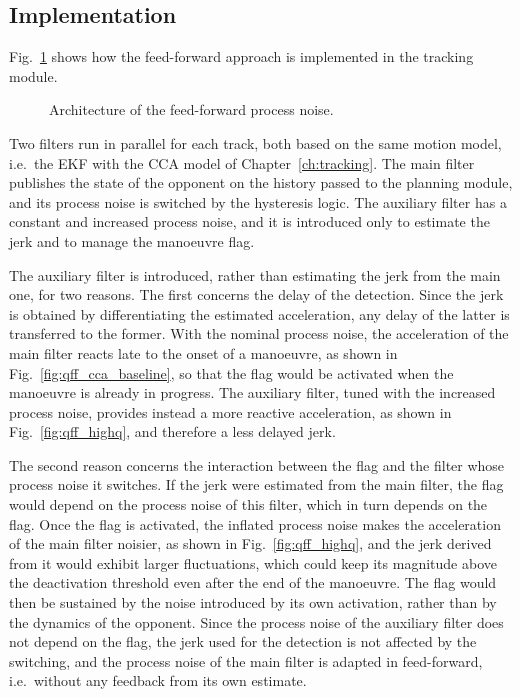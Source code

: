 \subsection{Implementation}
\label{subsec:qff_implementation}
\label{sec:qff_implementation}

Fig.~\ref{fig:qff_scheme} shows how the feed-forward approach is implemented in the tracking
module.

\begin{figure}[H]
    \centering
    
    \caption{Architecture of the feed-forward process noise.}
    \label{fig:qff_scheme}
\end{figure}

Two filters run in parallel for each track, both based on the same motion model, i.e.\ the EKF
with the CCA model of Chapter~\ref{ch:tracking}. The main filter publishes the state of
the opponent on the history passed to the planning module, and its process noise is switched
by the hysteresis logic. The auxiliary filter has a constant and increased process noise, and it is
introduced only to estimate the jerk and to manage the manoeuvre flag.

The auxiliary filter is introduced, rather than estimating the jerk from the main one, for two
reasons. The first concerns the delay of the detection. Since the jerk is obtained by
differentiating the estimated acceleration, any delay of the latter is transferred to the former.
With the nominal process noise, the acceleration of the main filter reacts late to the onset of a
manoeuvre, as shown in Fig.~\ref{fig:qff_cca_baseline}, so that the flag would be activated when
the manoeuvre is already in progress. The auxiliary filter, tuned with the increased process
noise, provides instead a more reactive acceleration, as shown in Fig.~\ref{fig:qff_highq}, and
therefore a less delayed jerk.

The second reason concerns the interaction between the flag and the filter whose process noise
it switches. If the jerk were estimated from the main filter, the flag would depend on the
process noise of this filter, which in turn depends on the flag. Once the flag is activated, the
inflated process noise makes the acceleration of the main filter noisier, as shown in
Fig.~\ref{fig:qff_highq}, and the jerk derived from it would exhibit larger fluctuations, which
could keep its magnitude above the deactivation threshold even after the end of the manoeuvre.
The flag would then be sustained by the noise introduced by its own activation, rather than by
the dynamics of the opponent. Since the process noise of the auxiliary filter does not depend on
the flag, the jerk used for the detection is not affected by the switching, and the process
noise of the main filter is adapted in feed-forward, i.e.\ without any feedback from its own
estimate.

